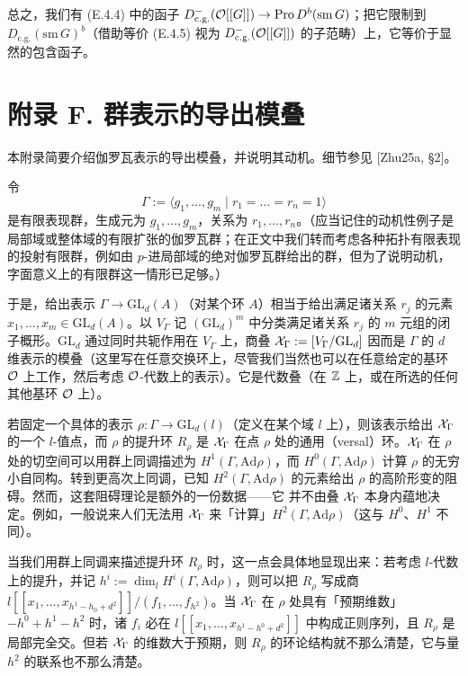 总之，我们有 (E.4.4) 中的函子 $D^-_{\mathrm{c.g.}}(\mathcal{O}[[G]])\to\mathrm{Pro}\,D^b(\mathrm{sm}\,G)$；把它限制到 $D_{\mathrm{c.g.}}(\mathrm{sm}\,G)^b$（借助等价 (E.4.5) 视为 $D^-_{\mathrm{c.g.}}(\mathcal{O}[[G]])$ 的子范畴）上，它等价于显然的包含函子。

\section*{附录 F. 群表示的导出模叠}

本附录简要介绍伽罗瓦表示的导出模叠，并说明其动机。细节参见 [Zhu25a, §2]。

令
\[
\Gamma:=\langle g_1,\dots,g_m\mid r_1=\dots=r_n=1\rangle
\]
是有限表现群，生成元为 $g_1,\dots,g_m$，关系为 $r_1,\dots,r_n$。（应当记住的动机性例子是局部域或整体域的有限扩张的伽罗瓦群；在正文中我们转而考虑各种拓扑有限表现的投射有限群，例如由 $p$-进局部域的绝对伽罗瓦群给出的群，但为了说明动机，字面意义上的有限群这一情形已足够。）

于是，给出表示 $\Gamma\to\mathrm{GL}_d(A)$（对某个环 $A$）相当于给出满足诸关系 $r_j$ 的元素 $x_1,\dots,x_m\in\mathrm{GL}_d(A)$。以 $V_\Gamma$ 记 $(\mathrm{GL}_d)^m$ 中分类满足诸关系 $r_j$ 的 $m$ 元组的闭子概形。$\mathrm{GL}_d$ 通过同时共轭作用在 $V_\Gamma$ 上，商叠 $\mathcal{X}_\Gamma:=[V_\Gamma/\mathrm{GL}_d]$ 因而是 $\Gamma$ 的 $d$ 维表示的模叠（这里写在任意交换环上，尽管我们当然也可以在任意给定的基环 $\mathcal{O}$ 上工作，然后考虑 $\mathcal{O}$-代数上的表示）。它是代数叠（在 $\mathbb{Z}$ 上，或在所选的任何其他基环 $\mathcal{O}$ 上）。

若固定一个具体的表示 $\rho:\Gamma\to\mathrm{GL}_d(l)$（定义在某个域 $l$ 上），则该表示给出 $\mathcal{X}_\Gamma$ 的一个 $l$-值点，而 $\rho$ 的提升环 $R_\rho$ 是 $\mathcal{X}_\Gamma$ 在点 $\rho$ 处的通用（versal）环。$\mathcal{X}_\Gamma$ 在 $\rho$ 处的切空间可以用群上同调描述为 $H^1(\Gamma,\mathrm{Ad}\rho)$，而 $H^0(\Gamma,\mathrm{Ad}\rho)$ 计算 $\rho$ 的无穷小自同构。转到更高次上同调，已知 $H^2(\Gamma,\mathrm{Ad}\rho)$ 的元素给出 $\rho$ 的高阶形变的阻碍。然而，这套阻碍理论是额外的一份数据——它
并不由叠 $\mathcal{X}_\Gamma$ 本身内蕴地决定。例如，一般说来人们无法用 $\mathcal{X}_\Gamma$ 来「计算」$H^2(\Gamma,\mathrm{Ad}\rho)$（这与 $H^0$、$H^1$ 不同）。

当我们用群上同调来描述提升环 $R_\rho$ 时，这一点会具体地显现出来：若考虑 $l$-代数上的提升，并记 $h^i:=\dim_lH^i(\Gamma,\mathrm{Ad}\rho)$，则可以把 $R_\rho$ 写成商 $l[[x_1,\dots,x_{h^1-h_0+d^2}]]/(f_1,\dots,f_{h^2})$。当 $\mathcal{X}_\Gamma$ 在 $\rho$ 处具有「预期维数」$-h^0+h^1-h^2$ 时，诸 $f_i$ 必在 $l[[x_1,\dots,x_{h^1-h^0+d^2}]]$ 中构成正则序列，且 $R_\rho$ 是局部完全交。但若 $\mathcal{X}_\Gamma$ 的维数大于预期，则 $R_\rho$ 的环论结构就不那么清楚，它与量 $h^2$ 的联系也不那么清楚。

